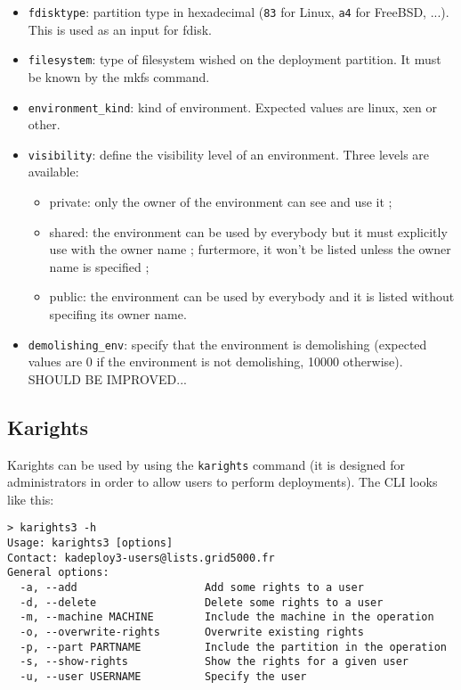 \documentclass[a4wide,10pt,oneside]{book}
\begin{document}
\begin{itemize}
\item \texttt{fdisktype}: partition type in hexadecimal (\texttt{83} for Linux, \texttt{a4} for FreeBSD, ...). This is used as an input for fdisk.
\item \texttt{filesystem}: type of filesystem wished on the deployment partition. It must be known by the mkfs command.
\item \texttt{environment\_kind}: kind of environment. Expected values are linux, xen or other.
\item \texttt{visibility}: define the visibility level of an environment. Three levels are available:
\begin{itemize}
\item private: only the owner of the environment can see and use it ;
\item shared: the environment can be used by everybody but it must explicitly use with the owner name ; furtermore, it won't be listed unless the owner name is specified ;
\item public: the environment can be used by everybody and it is listed without specifing its owner name.
\end{itemize}
\item \texttt{demolishing\_env}: specify that the environment is demolishing (expected values are 0 if the environment is not demolishing, 10000 otherwise). SHOULD BE IMPROVED...
\end{itemize}

\subsection{Karights}\label{sec:karights}
Karights can be used by using the \texttt{karights} command (it is designed for administrators in order to allow users to perform deployments). The CLI looks like this:
\begin{small}
\begin{verbatim}
> karights3 -h
Usage: karights3 [options]
Contact: kadeploy3-users@lists.grid5000.fr
General options:
  -a, --add                    Add some rights to a user
  -d, --delete                 Delete some rights to a user
  -m, --machine MACHINE        Include the machine in the operation
  -o, --overwrite-rights       Overwrite existing rights
  -p, --part PARTNAME          Include the partition in the operation
  -s, --show-rights            Show the rights for a given user
  -u, --user USERNAME          Specify the user
\end{verbatim}
\end{small}
\end{document}
